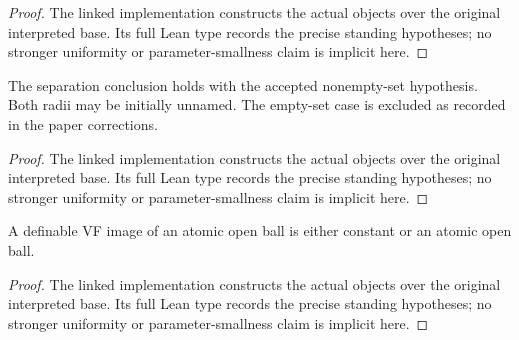 \begin{proof}


\leanok

The linked implementation constructs the actual objects over the original interpreted base. Its full Lean type records the precise standing hypotheses; no stronger uniformity or parameter-smallness claim is implicit here.

\end{proof}

\begin{lemma}

\label{s3-11}


\leanok

The separation conclusion holds with the accepted nonempty-set hypothesis. Both radii may be initially unnamed. The empty-set case is excluded as recorded in the paper corrections.

\end{lemma}

\begin{proof}


\leanok

The linked implementation constructs the actual objects over the original interpreted base. Its full Lean type records the precise standing hypotheses; no stronger uniformity or parameter-smallness claim is implicit here.

\end{proof}

\begin{lemma}

\label{s3-13}


\leanok

A definable VF image of an atomic open ball is either constant or an atomic open ball.

\end{lemma}

\begin{proof}


\leanok

The linked implementation constructs the actual objects over the original interpreted base. Its full Lean type records the precise standing hypotheses; no stronger uniformity or parameter-smallness claim is implicit here.

\end{proof}

